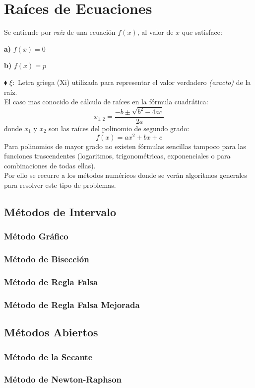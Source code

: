 \chapter{Raíces de Ecuaciones}
Se entiende por \textit{raíz} de una ecuación $f(x)$, al valor de $x$ que satisface:
\begin{multicols}{2}
\textbf{a)} $f(x)=0$
\columnbreak
\begin{flushleft}
\textbf{b)} $f(x)=p$
\end{flushleft}
\end{multicols}
$\blacklozenge$ $\xi:$ Letra griega (Xi) utilizada para representar el valor verdadero \textit{(exacto)} de la raíz.
\\${ }$\\
El caso mas conocido de cálculo de raíces en la fórmula cuadrática:
$$x_{1,2}=\dfrac{-b \pm \sqrt{b^2 - 4ac}}{2a}$$
donde $x_1$ y $x_2$ son las raíces del polinomio de segundo grado:
$$f(x)=ax^2+bx+c$$
Para polinomios de mayor grado no  existen fórmulas sencillas tampoco para las funciones trascendentes (logaritmos, trigonométricas, exponenciales o para combinaciones de todas ellas).
\\${ }$\\
Por ello se recurre a los métodos numéricos donde se verán algoritmos generales para resolver este tipo de problemas.
\section{Métodos de Intervalo}
\subsection{Método Gráfico}
\subsection{Método de Bisección}
\subsection{Método de Regla Falsa}
\subsection{Método de Regla Falsa Mejorada}
\section{Métodos Abiertos}
\subsection{Método de la Secante}
\subsection{Método de Newton-Raphson}